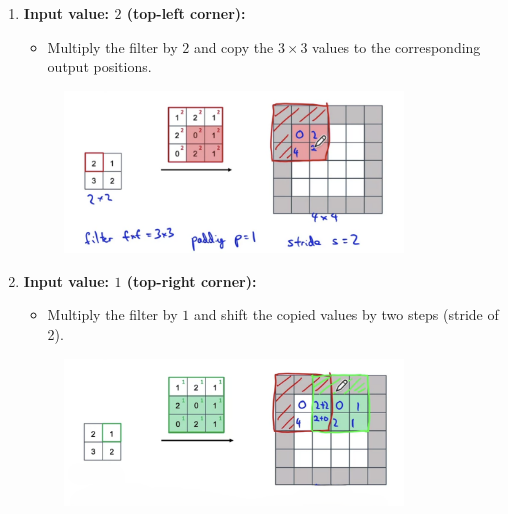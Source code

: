 \documentclass[letterpaper,12pt,notitlepage,twoside]{report}
\begin{document}
\begin{enumerate}
    \item \textbf{Input value: $2$ (top-left corner):}
    \begin{itemize}
        \item Multiply the filter by $2$ and copy the $3 \times 3$ values to the corresponding output positions.
    \end{itemize}
	\begin{figure}[h]
		\centering
		\includegraphics[width=0.85\textwidth]{Images/Transpose Convolution - Step 1.png}
		\label{fig:47}
	\end{figure}
	\FloatBarrier

    \item \textbf{Input value: $1$ (top-right corner):}
    \begin{itemize}
        \item Multiply the filter by $1$ and shift the copied values by two steps (stride of 2).
    \end{itemize}
	\begin{figure}[h]
		\centering
		\includegraphics[width=0.85\textwidth]{Images/Transpose Convolution - Step 2.png}
		\label{fig:48}
	\end{figure}
	\FloatBarrier


\end{enumerate}
\end{document}

